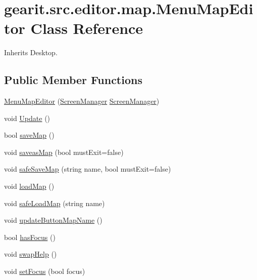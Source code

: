 \hypertarget{classgearit_1_1src_1_1editor_1_1map_1_1_menu_map_editor}{\section{gearit.\+src.\+editor.\+map.\+Menu\+Map\+Editor Class Reference}
\label{classgearit_1_1src_1_1editor_1_1map_1_1_menu_map_editor}
}


Inherits Desktop.

\subsection*{Public Member Functions}
\begin{DoxyCompactItemize}
\item 
\hyperlink{classgearit_1_1src_1_1editor_1_1map_1_1_menu_map_editor_ae0cb858d977d428a381d73a077ab7ef9}{Menu\+Map\+Editor} (\hyperlink{classgearit_1_1xna_1_1_screen_manager}{Screen\+Manager} \hyperlink{classgearit_1_1xna_1_1_screen_manager}{Screen\+Manager})
\item 
void \hyperlink{classgearit_1_1src_1_1editor_1_1map_1_1_menu_map_editor_a4327e2c92caa66fe705b0427a87a0f4a}{Update} ()
\item 
bool \hyperlink{classgearit_1_1src_1_1editor_1_1map_1_1_menu_map_editor_a3e9a425cb64e1ee47ea9d9a72833de46}{save\+Map} ()
\item 
void \hyperlink{classgearit_1_1src_1_1editor_1_1map_1_1_menu_map_editor_a08a8c9769958de4d39bcd6844c9382eb}{saveas\+Map} (bool must\+Exit=false)
\item 
void \hyperlink{classgearit_1_1src_1_1editor_1_1map_1_1_menu_map_editor_a4831ba3548a1bf23798384c65757f1f1}{safe\+Save\+Map} (string name, bool must\+Exit=false)
\item 
void \hyperlink{classgearit_1_1src_1_1editor_1_1map_1_1_menu_map_editor_a274f68537473750f3fbc8e845718f8d6}{load\+Map} ()
\item 
void \hyperlink{classgearit_1_1src_1_1editor_1_1map_1_1_menu_map_editor_a195fa3425f212cf6e85c15aad66e321e}{safe\+Load\+Map} (string name)
\item 
void \hyperlink{classgearit_1_1src_1_1editor_1_1map_1_1_menu_map_editor_a9ca206ed79c3174880943a1946be9571}{update\+Button\+Map\+Name} ()
\item 
bool \hyperlink{classgearit_1_1src_1_1editor_1_1map_1_1_menu_map_editor_ad336db68100fba294a888f6b9041f85e}{has\+Focus} ()
\item 
void \hyperlink{classgearit_1_1src_1_1editor_1_1map_1_1_menu_map_editor_ae2d1bb2a2157e2abfcafd181914d5ce3}{swap\+Help} ()
\item 
void \hyperlink{classgearit_1_1src_1_1editor_1_1map_1_1_menu_map_editor_abf4a6617420407421450f729c3b1c9e1}{set\+Focus} (bool focus)
\end{DoxyCompactItemize}
